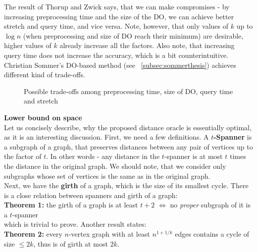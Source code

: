\documentclass[a4paper]{article}
\newif\ifmine %
\newcommand{\inputTikZ}[1]{%
  }
\newcommand{\inputTikZ}[1]{%
    \beginpgfgraphicnamed{#1-external}%
    \endpgfgraphicnamed%
  }
\newcommand{\textbff}[1]{{\large \textbf{#1}}}
\begin{document}
        The result of Thorup and Zwick says, that we can make compromises - by increasing preprocessing time and the size of the DO, we can achieve better stretch and query time, and vice versa. Note, however, that only values of $k$ up to $\log n$ (when preprocessing and size of DO reach their minimum) are desirable, higher values of $k$ already increase all the factors. Also note, that increasing query time does not increase the accuracy, which is a bit counterintuitive. Christian Sommer's DO-based method (see ~\ref{subsec:sommerthesis}) achieves different kind of trade-offs. \\

        \begin{figure}[h]
            \scriptsize
            \begin{center}
                \inputTikZ{./tikzpics/thorupcompromises}
            \end{center}
            \caption{\label{fig:apxdocompromises} Possible trade-offs among preprocessing time, size of DO, query time and stretch}
        \end{figure}

\ifmine
        \textbff{Lower bound on space} \\

        Let us concisely describe, why the proposed distance oracle is essentially optimal, as it is an interesting discussion. First, we need a few definitions. \def\defspanner{A \textbf{$t$-Spanner} is a subgraph of a graph, that preserves distances between any pair of vertices up to the factor of $t$}\defspanner . In other words - any distance in the $t$-spanner is at most $t$ times the distance in the original graph. We should note, that we consider only subgraphs whose set of vertices is the same as in the original graph. \\

        Next, we have the \def\defgirth{\textbf{girth} of a graph, which is the size of its smallest cycle}\defgirth . There is a close relation between spanners and girth of a graph: \\

        \textbf{Theorem 1:} \def\resspangirth{the girth of a graph is at least $t+2$ $\iff$ no \emph{proper} subgraph of it is a $t$-spanner}\resspangirth\\

        which is trivial to prove. Another result states: \\

        \textbf{Theorem 2:} \def\resgirthtwok{every $n$-vertex graph with at least $n^{1 + 1/k}$ edges contains a cycle of size $\leq 2k$, thus is of girth at most $2k$}\resgirthtwok . \\
\end{document}
